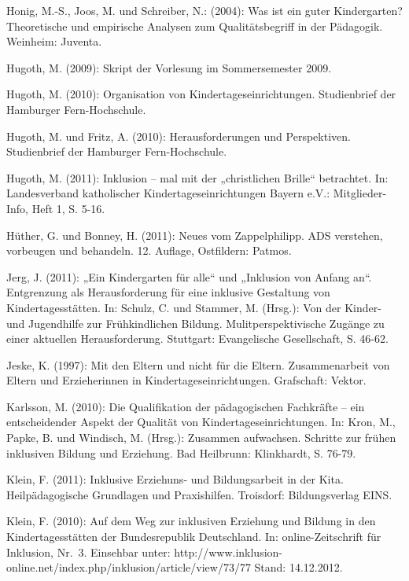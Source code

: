 Honig, M.-S., Joos, M. und Schreiber, N.: (2004): Was ist ein guter Kindergarten? Theoretische und empirische Analysen zum Qualitätsbegriff in der Pädagogik. Weinheim: Juventa.

Hugoth, M. (2009): Skript der Vorlesung im Sommersemester 2009. 

Hugoth, M. (2010): Organisation von Kindertageseinrichtungen. Studienbrief der Hamburger Fern-Hochschule.

Hugoth, M. und Fritz, A. (2010): Herausforderungen und Perspektiven. Studienbrief der Hamburger Fern-Hochschule.

Hugoth, M. (2011): Inklusion – mal mit der „christlichen Brille“ betrachtet. In: Landesverband katholischer Kindertageseinrichtungen Bayern e.V.: Mitglieder-Info, Heft 1, S. 5-16.

Hüther, G. und Bonney, H. (2011): Neues vom Zappelphilipp. ADS verstehen, vorbeugen und behandeln. 12. Auflage, Ostfildern: Patmos.

Jerg, J. (2011): „Ein Kindergarten für alle“ und „Inklusion von Anfang an“. Entgrenzung als Herausforderung für eine inklusive Gestaltung von Kindertagesstätten. In: Schulz, C. und Stammer, M. (Hrsg.): Von der Kinder- und Jugendhilfe zur Frühkindlichen Bildung. Mulitperspektivische Zugänge zu einer aktuellen Herausforderung. Stuttgart: Evangelische Gesellschaft, S. 46-62. 

Jeske, K. (1997): Mit den Eltern und nicht für die Eltern. Zusammenarbeit von Eltern und Erzieherinnen in Kindertageseinrichtungen. Grafschaft: Vektor.

Karlsson, M. (2010): Die Qualifikation der pädagogischen Fachkräfte -- ein entscheidender Aspekt der Qualität von Kindertageseinrichtungen. In: Kron, M., Papke, B. und Windisch, M. (Hrsg.): Zusammen aufwachsen. Schritte zur frühen inklusiven Bildung und Erziehung. Bad Heilbrunn: Klinkhardt, S. 76-79. 

Klein, F. (2011): Inklusive Erziehuns- und Bildungsarbeit in der Kita. Heilpädagogische Grundlagen und Praxishilfen. Troisdorf: Bildungsverlag EINS.

Klein, F. (2010): Auf dem Weg zur inklusiven Erziehung und Bildung in den Kindertagesstätten der Bundesrepublik Deutschland. In: online-Zeitschrift für Inklusion, Nr.~3. Einsehbar unter: http://www.inklusion-online.net/index.php/inklusion/article/view/73/77 Stand: 14.12.2012.  


